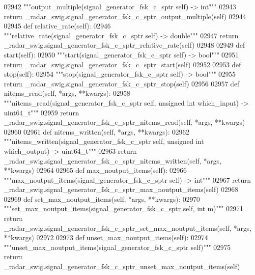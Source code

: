 \begin{DoxyCode}
{{{{{{{{{{{02942         \textcolor{stringliteral}{"""output\_multiple(signal\_generator\_fsk\_c\_sptr self) -> int"""}
02943         \textcolor{keywordflow}{return} \_radar\_swig.signal\_generator\_fsk\_c\_sptr\_output\_multiple(self)
02944 
02945     \textcolor{keyword}{def }relative_rate(self):
02946         \textcolor{stringliteral}{"""relative\_rate(signal\_generator\_fsk\_c\_sptr self) -> double"""}
02947         \textcolor{keywordflow}{return} \_radar\_swig.signal\_generator\_fsk\_c\_sptr\_relative\_rate(self)
02948 
02949     \textcolor{keyword}{def }start(self):
02950         \textcolor{stringliteral}{"""start(signal\_generator\_fsk\_c\_sptr self) -> bool"""}
02951         \textcolor{keywordflow}{return} \_radar\_swig.signal\_generator\_fsk\_c\_sptr\_start(self)
02952 
02953     \textcolor{keyword}{def }stop(self):
02954         \textcolor{stringliteral}{"""stop(signal\_generator\_fsk\_c\_sptr self) -> bool"""}
02955         \textcolor{keywordflow}{return} \_radar\_swig.signal\_generator\_fsk\_c\_sptr\_stop(self)
02956 
02957     \textcolor{keyword}{def }nitems_read(self, *args, **kwargs):
02958         \textcolor{stringliteral}{"""nitems\_read(signal\_generator\_fsk\_c\_sptr self, unsigned int which\_input) -> uint64\_t"""}
02959         \textcolor{keywordflow}{return} \_radar\_swig.signal\_generator\_fsk\_c\_sptr\_nitems\_read(self, *args, **kwargs)
02960 
02961     \textcolor{keyword}{def }nitems_written(self, *args, **kwargs):
02962         \textcolor{stringliteral}{"""nitems\_written(signal\_generator\_fsk\_c\_sptr self, unsigned int which\_output) -> uint64\_t"""}
02963         \textcolor{keywordflow}{return} \_radar\_swig.signal\_generator\_fsk\_c\_sptr\_nitems\_written(self, *args, **kwargs)
02964 
02965     \textcolor{keyword}{def }max_noutput_items(self):
02966         \textcolor{stringliteral}{"""max\_noutput\_items(signal\_generator\_fsk\_c\_sptr self) -> int"""}
02967         \textcolor{keywordflow}{return} \_radar\_swig.signal\_generator\_fsk\_c\_sptr\_max\_noutput\_items(self)
02968 
02969     \textcolor{keyword}{def }set_max_noutput_items(self, *args, **kwargs):
02970         \textcolor{stringliteral}{"""set\_max\_noutput\_items(signal\_generator\_fsk\_c\_sptr self, int m)"""}
02971         \textcolor{keywordflow}{return} \_radar\_swig.signal\_generator\_fsk\_c\_sptr\_set\_max\_noutput\_items(self, *args, **kwargs)
02972 
02973     \textcolor{keyword}{def }unset_max_noutput_items(self):
02974         \textcolor{stringliteral}{"""unset\_max\_noutput\_items(signal\_generator\_fsk\_c\_sptr self)"""}
02975         \textcolor{keywordflow}{return} \_radar\_swig.signal\_generator\_fsk\_c\_sptr\_unset\_max\_noutput\_items(self)
}}}}}}}}}}}
\end{DoxyCode}
